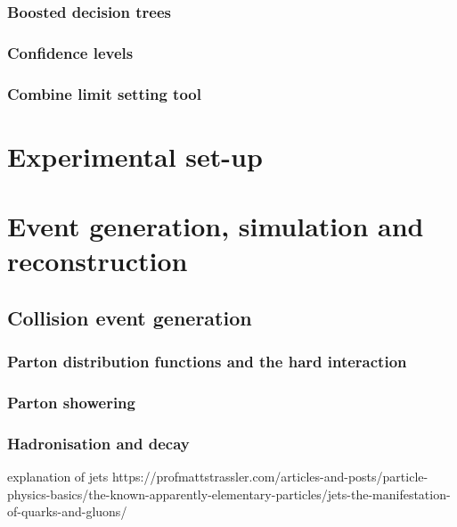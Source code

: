 \subsection{Boosted decision trees}
\subsection{Confidence levels }

\subsection{Combine limit setting tool}

\chapter{Experimental set-up}


\begin{comment}

CERN ACC 2017 0007 --> beam energy uncertainty

\end{comment}


\chapter{Event generation, simulation and reconstruction}
\section{Collision event generation}
\subsection{Parton distribution functions and the hard interaction}
\subsection{Parton showering}
\subsection{Hadronisation and decay}
explanation of jets https://profmattstrassler.com/articles-and-posts/particle-physics-basics/the-known-apparently-elementary-particles/jets-the-manifestation-of-quarks-and-gluons/
